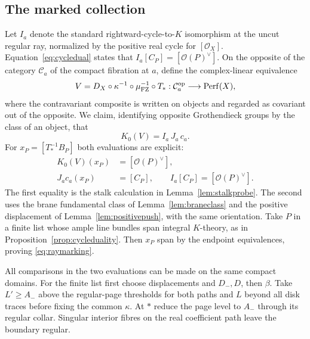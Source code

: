 \subsection{The marked collection}\label{sec:markedtheorem}
Let $I_a$ denote the standard rightward-cycle-to-$K$ isomorphism at the uncut regular ray, normalized by the positive real cycle for $[\mathcal O_X]$. Equation~\eqref{eq:cycledual} states that $I_a[C_P]=[\mathcal O(P)^\vee]$. On the opposite of the category $\mathcal C_a$ of the compact fibration at $a$, define the complex-linear equivalence
\[
       V=D_X\circ\kappa^{-1}\circ\mu_{\rm FZ}^{-1}\circ T_*
       :\mathcal C_a^{\mathrm{op}}\longrightarrow\mathrm{Perf}(X),
\]
where the contravariant composite is written on objects and regarded as covariant out of the opposite. We claim, identifying opposite Grothendieck groups by the class of an object, that
\begin{equation}\label{eq:raymarking}
                         K_0(V)=I_a\,J_a\,c_a .
\end{equation}
For $x_P=[T_*^{-1}B_P]$ both evaluations are explicit:
\[
 \begin{aligned}
      K_0(V)(x_P)&=[\mathcal O(P)^\vee],\\
      J_a c_a(x_P)&=[C_P],\qquad I_a[C_P]=[\mathcal O(P)^\vee].
 \end{aligned}
\]
The first equality is the stalk calculation in Lemma~\ref{lem:stalkprobe}. The second uses the brane fundamental class of Lemma~\ref{lem:braneclass} and the positive displacement of Lemma~\ref{lem:positivepush}, with the same orientation. Take $P$ in a finite list whose ample line bundles span integral $K$-theory, as in Proposition~\ref{prop:cycleduality}. Then $x_P$ span by the endpoint equivalences, proving \eqref{eq:raymarking}.

All comparisons in the two evaluations can be made on the same compact domains. For the finite list first choose displacements and $D_-,D$, then $\beta$. Take $L'\ge A_-$ above the regular-page thresholds for both paths and $L$ beyond all disk traces before fixing the common $\kappa$. At $*$ reduce the page level to $A_-$ through its regular collar. Singular interior fibres on the real coefficient path leave the boundary regular.

